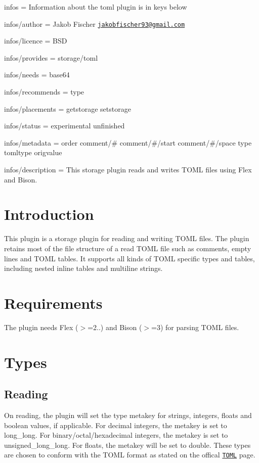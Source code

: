 
\begin{DoxyItemize}
\item infos = Information about the toml plugin is in keys below
\item infos/author = Jakob Fischer \href{mailto:jakobfischer93@gmail.com}{\tt jakobfischer93@gmail.\+com}
\item infos/licence = B\+SD
\item infos/provides = storage/toml
\item infos/needs = base64
\item infos/recommends = type
\item infos/placements = getstorage setstorage
\item infos/status = experimental unfinished
\item infos/metadata = order comment/\# comment/\#/start comment/\#/space type tomltype origvalue
\item infos/description = This storage plugin reads and writes T\+O\+ML files using Flex and Bison.
\end{DoxyItemize}\hypertarget{autotoc_md642_src_plugins_toml_README_md}{}\section{Introduction}\label{autotoc_md642_src_plugins_toml_README_md}
This plugin is a storage plugin for reading and writing T\+O\+ML files. The plugin retains most of the file structure of a read T\+O\+ML file such as comments, empty lines and T\+O\+ML tables. It supports all kinds of T\+O\+ML specific types and tables, including nested inline tables and multiline strings.\hypertarget{autotoc_md642_autotoc_md643}{}\section{Requirements}\label{autotoc_md642_autotoc_md643}
The plugin needs Flex ($>$=2..) and Bison ($>$=3) for parsing T\+O\+ML files.\hypertarget{autotoc_md642_autotoc_md644}{}\section{Types}\label{autotoc_md642_autotoc_md644}
\hypertarget{autotoc_md642_autotoc_md645}{}\subsection{Reading}\label{autotoc_md642_autotoc_md645}
On reading, the plugin will set the {\ttfamily type} metakey for strings, integers, floats and boolean values, if applicable. For decimal integers, the metakey is set to {\ttfamily long\+\_\+long}. For binary/octal/hexadecimal integers, the metakey is set to {\ttfamily unsigned\+\_\+long\+\_\+long}. For floats, the metakey will be set to {\ttfamily double}. These types are chosen to conform with the T\+O\+ML format as stated on the offical \href{https://toml.io/en/v1.0.0-rc.1}{\tt T\+O\+ML} page.

